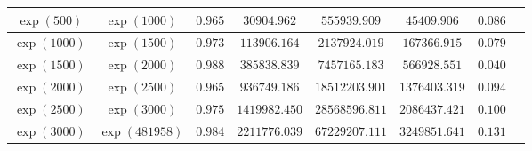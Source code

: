 \documentclass[reqno]{amsart}
\numberwithin{equation}{section}
\theoremstyle{remark}
\begin{document}
\begin{table}[h]
\begin{tabular}{|c|c|c|c|c|c|c|c|}
\hline
$\exp(500)$ & $\exp(1000)$ & $0.965 $ & $30904.962 $ & $555939.909 $ & $45409.906$ & $ 0.086 $ \\
\hline
$\exp(1000)$ & $\exp(1500)$ & $0.973 $ & $113906.164$ & $2137924.019$ & $167366.915$ & $0.079 $\\
\hline
$\exp(1500)$ & $\exp(2000)$ & $0.988$ & $385838.839$ & $7457165.183$ & $566928.551$ & $0.040$ \\
\hline
$\exp(2000)$ & $\exp(2500)$ &  $0.965$& $936749.186$ & $18512203.901$ & $1376403.319$ & $0.094$\\
\hline
$\exp(2500)$ & $\exp(3000)$ &  $0.975$& $1419982.450$ & $28568596.811$ & $2086437.421$ & $0.100$\\
\hline
$\exp(3000)$ & $\exp(481958)$ & $0.984$ & $2211776.039$ &  $67229207.111$ & $3249851.641$ & $ 0.131$\\
\hline
\end{tabular}
\label{cconstants}
\end{table}  

\clearpage
\printbibliography
\end{document}
